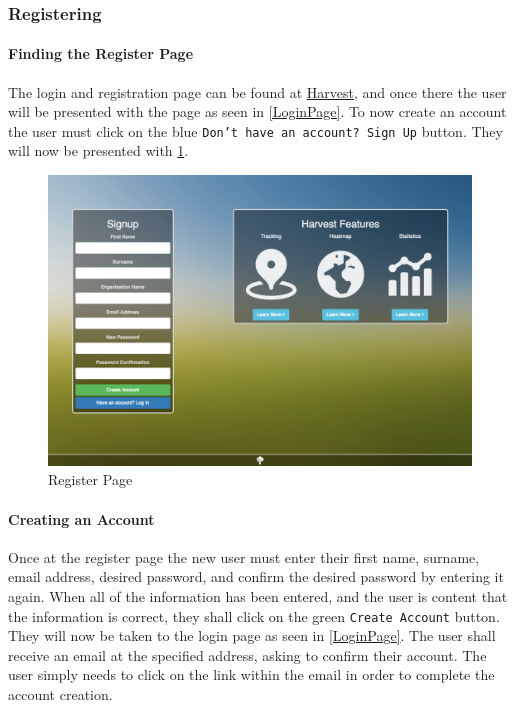 \documentclass[11pt]{article}
\begin{document}
\subsubsection{Registering}
\paragraph{Finding the Register Page}The login and registration page can be found at \href{https://harvestapp.co.za}{Harvest}, and once there the user will be presented with the page as seen in \ref{LoginPage}. To now create an account the user must click on the blue \texttt{Don't have an account? Sign Up} button. They will now be presented with \ref{RegisterPage}.

\begin{figure}
 \centering
 \includegraphics[width=12cm, keepaspectratio]{Images/GettingStarted/WebRegister.png}
 \caption{Register Page}
 \label{RegisterPage}
\end{figure}

\paragraph{Creating an Account}Once at the register page the new user must enter their first name, surname, email address, desired password, and confirm the desired password by entering it again. When all of the information has been entered, and the user is content that the information is correct, they shall click on the green \texttt{Create Account} button. They will now be taken to the login page as seen in \ref{LoginPage}. The user shall receive an email at the specified address, asking to confirm their account. The user simply needs to click on the link within the email in order to complete the account creation.
\end{document}
